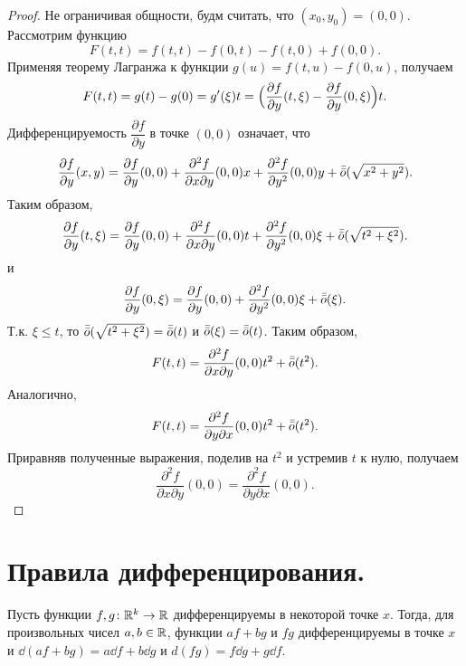 \documentclass[a4paper]{article}
\theoremstyle{named}
\begin{document}
    \begin{proof}
        Не ограничивая общности, будм считать, что $(x_0,y_0)=(0,0)$.
        Рассмотрим функцию
        $$
        F(t,t) = f(t,t) - f(0,t) - f(t,0) + f(0,0).
        $$
        Применяя теорему Лагранжа к функции $g(u)= f(t,u)-f(0,u)$,
        получаем
        $$
        F(t,t) = g(t) - g(0) = g'(\xi)t = \Bigl(\dfrac{\partial f}{\partial y}(t,\xi) -  \dfrac{\partial f}{\partial y}(0,\xi)\Bigr)t.
        $$
        Дифференцируемость $\dfrac{\partial f}{\partial y}$ в точке $(0,0)$ означает, что
        $$
        \dfrac{\partial f}{\partial y}(x,y) = \dfrac{\partial f}{\partial y}(0,0) +
        \dfrac{\partial^2 f}{\partial x\partial y}(0,0)x + \dfrac{\partial^2 f}{\partial y^2}(0,0)y + \bar{\bar{o}}(\sqrt{x^2+y^2}).
        $$
        Таким образом,
        $$
        \dfrac{\partial f}{\partial y}(t,\xi) = \dfrac{\partial f}{\partial y}(0,0) +
        \dfrac{\partial^2 f}{\partial x\partial y}(0,0)t + \dfrac{\partial^2 f}{\partial y^2}(0,0)\xi + \bar{\bar{o}}(\sqrt{t^2+\xi^2}).
        $$
        и
        $$
        \dfrac{\partial f}{\partial y}(0,\xi) = \dfrac{\partial f}{\partial y}(0,0) +
        \dfrac{\partial^2 f}{\partial y^2}(0,0)\xi + \bar{\bar{o}}(\xi).
        $$
        Т.к. $\xi\leq t$, то $\bar{\bar{o}}(\sqrt{t^2+\xi^2}) = \bar{\bar{o}}(t)$ и $\bar{\bar{o}}(\xi) = \bar{\bar{o}}(t)$.
        Таким образом,
        $$
        F(t,t) = \dfrac{\partial^2 f}{\partial x\partial y}(0,0)t^2 + \bar{\bar{o}}(t^2).
        $$
        Аналогично,
        $$
        F(t,t) = \dfrac{\partial^2 f}{\partial y\partial x}(0,0)t^2 + \bar{\bar{o}}(t^2).
        $$
        Приравняв полученные выражения, поделив на $t^2$ и устремив $t$ к нулю, получаем
        $$
        \dfrac{\partial^2 f}{\partial x\partial y}(0,0) = \dfrac{\partial^2 f}{\partial y\partial x}(0,0).
        $$
    \end{proof}

    \section{Правила дифференцирования.}

    \begin{theorem*}
        Пусть функции $f, g \colon \mathbb{R}^k\to \mathbb{R}$ дифференцируемы в некоторой точке $x$. Тогда, для произвольных чисел $a,b \in \mathbb{R}$,
        функции $af + bg$ и $fg$ дифференцируемы в точке $x$ и $\dd(af + bg) = a\dd f + b\dd g$ и $d(fg) = f\dd g + g\dd f$.
    \end{theorem*}
\end{document}
